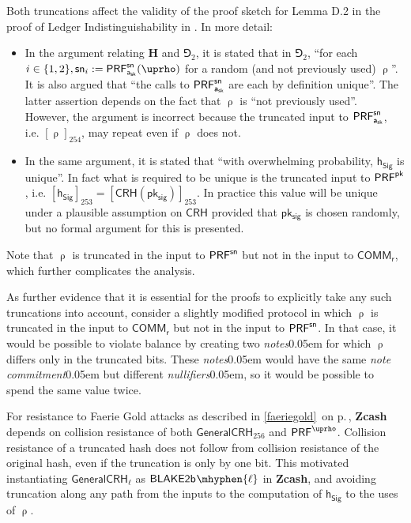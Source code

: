 \documentclass{article}
\renewcommand{\emph}[1]{\hspace{0.15em}{\fontfamily{pnc}\selectfont\scalebox{1.02}[0.999]{\textit{#1}}}\hspace{0.02em}}
\newcommand{\crossref}[1]{\autoref{#1}\, \emph{`\nameref*{#1}\kern -0.05em'} on p.\,\pageref*{#1}}
\newcommand{\term}[1]{\textsl{#1}\kern 0.05em\xspace}
\newcommand{\termbf}[1]{\textbf{#1}\xspace}
\newcommand{\Zcash}{\termbf{Zcash}}
\newcommand{\notes}{\term{notes}}
\newcommand{\noteCommitment}{\term{note commitment}}
\newcommand{\nullifiers}{\term{nullifiers}}
\newcommand{\GeneralCRH}[1]{\mathsf{GeneralCRH}_{#1}}
\newcommand{\CRH}{\mathsf{CRH}}
\newcommand{\Blake}[1]{\mathsf{BLAKE2b\kern 0.05em\mhyphen{#1}}}
\newcommand{\setof}[1]{\{{#1}\}}
\newcommand{\AuthPrivate}{\mathsf{a_{sk}}}
\newcommand{\PRF}[2]{\mathsf{{PRF}^{#2}_\mathnormal{#1}}}
\newcommand{\PRFsn}[1]{\PRF{#1}{sn}}
\newcommand{\PRFpk}[1]{\PRF{#1}{pk}}
\newcommand{\PRFrho}[1]{\PRF{#1}{\NoteAddressRand}}
\newcommand{\Commit}[1]{\mathsf{COMM}_{#1}}
\newcommand{\NoteCommitRand}{\mathsf{r}}
\newcommand{\NoteAddressRand}{\mathsf{\uprho}}
\newcommand{\pksig}{\mathsf{pk_{sig}}}
\newcommand{\hSig}{\mathsf{h_{Sig}}}
\begin{document}
Both truncations affect the validity of the proof sketch for Lemma D.2 in
the proof of Ledger Indistinguishability in \cite[Appendix D]{BCG+2014}.
In more detail:
\begin{itemize}
  \item In the argument relating $\mathbf{H}$ and $\Game_2$, it is stated that in $\Game_2$,
        ``for each $i \in \setof{1, 2}, \mathsf{sn}_i := \PRFsn{\AuthPrivate}(\NoteAddressRand)$
        for a random (and not previously used) $\NoteAddressRand$''. It is also
        argued that ``the calls to $\PRFsn{\AuthPrivate}$ are each by definition unique''.
        The latter assertion depends on the fact that $\NoteAddressRand$
        is ``not previously used''. However, the argument is incorrect
        because the truncated input to $\PRFsn{\AuthPrivate}$, i.e.
        $[\NoteAddressRand]_{254}$, may repeat even if $\NoteAddressRand$ does not.
  \item In the same argument, it is stated that ``with overwhelming probability,
        $\hSig$ is unique''. In fact what is required to be unique is the
        truncated input to $\PRFpk{}$, i.e. $[\hSig]_{253} = [\CRH(\pksig)]_{253}$.
        In practice this value will be unique under a plausible assumption on
        $\CRH$ provided that $\pksig$ is chosen randomly, but no formal argument
        for this is presented.
\end{itemize}

Note that $\NoteAddressRand$ is truncated in the input to $\PRFsn{}$
but not in the input to $\Commit{\NoteCommitRand}$, which further
complicates the analysis.

As further evidence that it is essential for the proofs to explicitly take any
such truncations into account, consider a slightly modified protocol in which
$\NoteAddressRand$ is truncated in the input to $\Commit{\NoteCommitRand}$
but not in the input to $\PRFsn{}$. In that case, it would be possible to
violate balance by creating two \notes for which $\NoteAddressRand$ differs
only in the truncated bits. These \notes would have the same \noteCommitment
but different \nullifiers, so it would be possible to spend the same value
twice.

For resistance to Faerie Gold attacks as described in
\crossref{faeriegold}, \Zcash depends on collision resistance of both
$\GeneralCRH{256}$ and $\PRFrho{}$. Collision resistance of a truncated hash
does not follow from collision resistance of the original hash, even if the
truncation is only by one bit. This motivated instantiating $\GeneralCRH{\ell}$
as $\Blake{\ell}$ in \Zcash, and avoiding truncation along any path from the
inputs to the computation of $\hSig$ to the uses of $\NoteAddressRand$.
\end{document}
